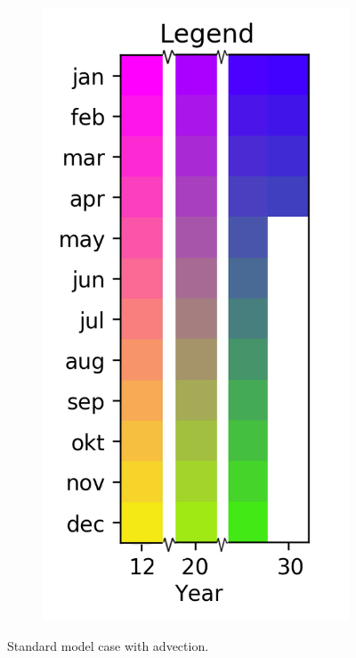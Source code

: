 \documentclass[twocolumn]{article}
\begin{document}
\begin{figure}
\begin{subfigure}[h]{0.20\textwidth}
\includegraphics[width=\textwidth,keepaspectratio]{12-30_reduced_legend.png}
\label{fig:}
\end{subfigure}\hfill
\caption{Standard model case with advection.}
\label{fig:with_adv_geen_uitslag}
\end{figure}
\end{document}
